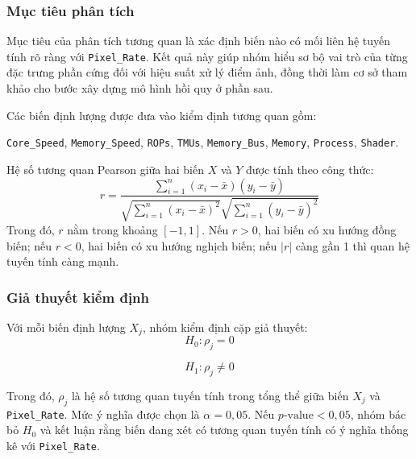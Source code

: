 \subsubsection{Mục tiêu phân tích}
Mục tiêu của phân tích tương quan là xác định biến nào có mối liên hệ tuyến tính rõ ràng với \texttt{Pixel\_Rate}. Kết quả này giúp nhóm hiểu sơ bộ vai trò của từng đặc trưng phần cứng đối với hiệu suất xử lý điểm ảnh, đồng thời làm cơ sở tham khảo cho bước xây dựng mô hình hồi quy ở phần sau.

Các biến định lượng được đưa vào kiểm định tương quan gồm:
\begin{center}
\texttt{Core\_Speed}, \texttt{Memory\_Speed}, \texttt{ROPs}, \texttt{TMUs}, \texttt{Memory\_Bus}, \texttt{Memory}, \texttt{Process}, \texttt{Shader}.
\end{center}
Hệ số tương quan Pearson giữa hai biến $X$ và $Y$ được tính theo công thức:
\[
r = \frac{\sum_{i=1}^{n}(x_i - \bar{x})(y_i - \bar{y})}
{\sqrt{\sum_{i=1}^{n}(x_i-\bar{x})^2}\sqrt{\sum_{i=1}^{n}(y_i-\bar{y})^2}}
\]
Trong đó, $r$ nằm trong khoảng $[-1,1]$. Nếu $r>0$, hai biến có xu hướng đồng biến; nếu $r<0$, hai biến có xu hướng nghịch biến; nếu $|r|$ càng gần 1 thì quan hệ tuyến tính càng mạnh.
\subsubsection{Giả thuyết kiểm định}
Với mỗi biến định lượng $X_j$, nhóm kiểm định cặp giả thuyết:
\[
H_0: \rho_j = 0
\]

\[
H_1: \rho_j \neq 0
\]

Trong đó, $\rho_j$ là hệ số tương quan tuyến tính trong tổng thể giữa biến $X_j$ và \texttt{Pixel\_Rate}. Mức ý nghĩa được chọn là $\alpha = 0{,}05$. Nếu $p\text{-value} < 0{,}05$, nhóm bác bỏ $H_0$ và kết luận rằng biến đang xét có tương quan tuyến tính có ý nghĩa thống kê với \texttt{Pixel\_Rate}.
